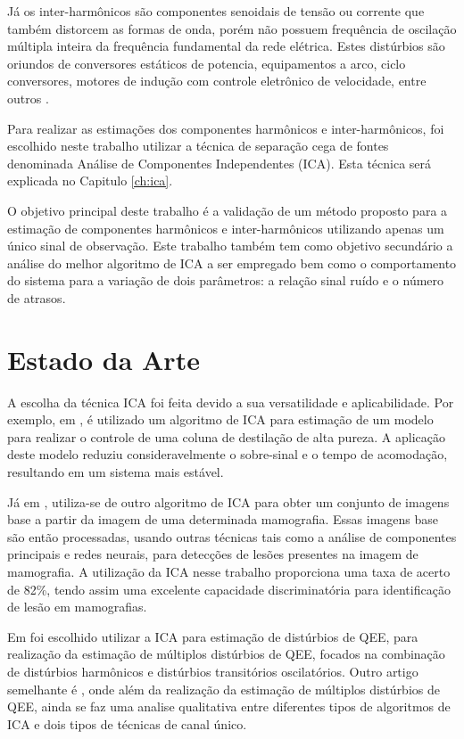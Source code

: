 \documentclass[a4paper,12pt]{monografia}
\theoremstyle{plain}
\theoremstyle{definition}
\theoremstyle{remark}
\begin{document}
Já os inter-harmônicos são componentes senoidais de tensão ou corrente que também distorcem as formas de onda, porém não possuem frequência de oscilação múltipla inteira da frequência fundamental da rede elétrica. Estes distúrbios são oriundos de conversores estáticos de potencia, equipamentos a arco, ciclo conversores, motores de indução com controle eletrônico de velocidade, entre outros \cite{dugan1996electrical}. 

Para realizar as estimações dos componentes harmônicos e inter-harmônicos, foi escolhido neste trabalho utilizar a técnica de separação cega de fontes denominada Análise de Componentes Independentes (ICA). Esta técnica será explicada no Capitulo \ref{ch:ica}.

O objetivo principal deste trabalho é a validação de um método proposto para a estimação de componentes harmônicos e inter-harmônicos utilizando apenas um único sinal de observação. Este trabalho também tem como objetivo secundário a análise do melhor algoritmo de ICA a ser empregado bem como o comportamento do sistema para a variação de dois parâmetros: a relação sinal ruído e o número de atrasos.

\section{Estado da Arte} %
\label{sec:revisao}

A escolha da técnica ICA foi feita devido a sua versatilidade e aplicabilidade. Por exemplo, em \cite{carmo2015aplicaccao}, é utilizado um algoritmo de ICA para estimação de um modelo para realizar o controle de uma coluna de destilação de alta pureza. A aplicação deste modelo reduziu consideravelmente o sobre-sinal e o tempo de acomodação, resultando em um sistema mais estável.

Já em \cite{leite2005analise}, utiliza-se de outro algoritmo de ICA para obter um conjunto de imagens base a partir da imagem de uma determinada mamografia. Essas imagens base são então processadas, usando outras técnicas tais como a análise de componentes principais e redes neurais, para detecções de lesões presentes na imagem de mamografia. A utilização da ICA nesse trabalho proporciona uma taxa de acerto de 82\%, tendo assim uma excelente capacidade discriminatória para identificação de lesão em mamografias.

Em \cite{limafiltragem} foi escolhido utilizar a ICA para estimação de distúrbios de QEE, para realização da estimação de múltiplos distúrbios de QEE, focados na combinação de distúrbios harmônicos e distúrbios transitórios oscilatórios. Outro artigo semelhante é \cite{DanielComparacao}, onde além da realização da estimação de múltiplos distúrbios de QEE, ainda se faz uma analise qualitativa entre diferentes tipos de algoritmos de ICA e dois tipos de técnicas de canal único.
\end{document}
